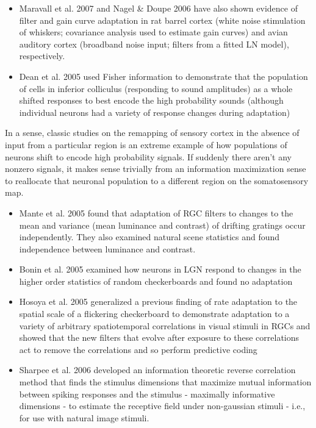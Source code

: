 \documentclass{article}
\begin{document}
\begin{itemize}
\item Maravall et al. 2007 and Nagel \& Doupe 2006 have also shown evidence of filter and gain curve adaptation in rat barrel cortex (white noise stimulation of whiskers; covariance analysis used to estimate gain curves) and avian auditory cortex (broadband noise input; filters from a fitted LN model), respectively.
\item Dean et al. 2005 used Fisher information to demonstrate that the population of cells in inferior colliculus (responding to sound amplitudes) as a whole shifted responses to best encode the high probability sounds (although individual neurons had a variety of response changes during adaptation)
\end{itemize}
In a sense, classic studies on the remapping of sensory cortex in the absence of input from a particular region is an extreme example of how populations of neurons shift to encode high probability signals.  If suddenly there aren't any nonzero signals, it makes sense trivially from an information maximization sense to reallocate that neuronal population to a different region on the somatosensory map.
\begin{itemize}
\item Mante et al. 2005 found that adaptation of RGC filters to changes to the mean and variance (mean luminance and contrast) of drifting gratings occur independently.  They also examined natural scene statistics and found independence between luminance and contrast.
\item Bonin et al. 2005 examined how neurons in LGN respond to changes in the higher order statistics of random checkerboards and found no adaptation
\item Hosoya et al. 2005 generalized a previous finding of rate adaptation to the spatial scale of a flickering checkerboard to demonstrate adaptation to a variety of arbitrary spatiotemporal correlations in visual stimuli in RGCs and showed that the new filters that evolve after exposure to these correlations act to remove the correlations and so perform predictive coding
\item Sharpee et al. 2006 developed an information theoretic reverse correlation method that finds the stimulus dimensions that maximize mutual information between spiking responses and the stimulus - maximally informative dimensions - to estimate the receptive field under non-gaussian stimuli - i.e., for use with natural image stimuli.
\end{itemize}
\end{document}
